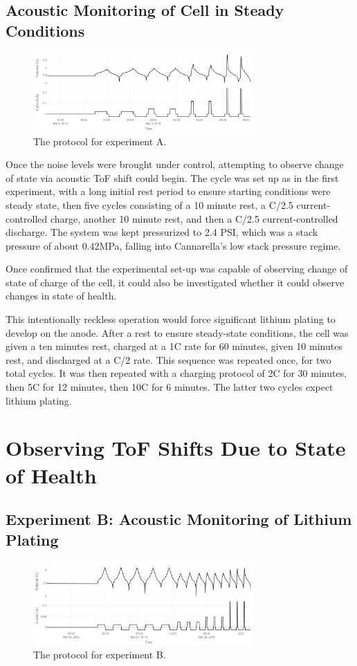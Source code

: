 \subsection{Acoustic Monitoring of Cell in Steady Conditions}
\begin{figure}[t]\label{fig:neware0309}
    \includegraphics[width=0.75\textwidth]{Thesis/neware0309.PNG}
    \centering
    \caption{The protocol for experiment A.}
\end{figure}
Once the noise levels were brought under control, attempting to observe change of state via acoustic ToF shift could begin. The cycle was set up as in the first experiment, with a long initial rest period to ensure starting conditions were steady state, then five cycles consisting of a 10 minute rest, a C/2.5 current-controlled charge, another 10 minute rest, and then a C/2.5 current-controlled discharge. 
The system was kept pressurized to 2.4 PSI, which was a stack pressure of about 0.42MPa, falling into Cannarella's low stack pressure regime.

Once confirmed that the experimental set-up was capable of observing change of state of charge of the cell, it could also be investigated whether it could observe changes in state of health.

This intentionally reckless operation would force significant lithium plating to develop on the anode. 
After a rest to ensure steady-state conditions, the cell was given a ten minutes rest, charged at a 1C rate for 60 minutes, given 10 minutes rest, and discharged at a C/2 rate. 
This sequence was repeated once, for two total cycles. 
It was then repeated with a charging protocol of 2C for 30 minutes, then 5C for 12 minutes, then 10C for 6 minutes. 
The latter two cycles expect lithium plating.

\section{Observing ToF Shifts Due to State of Health} 
\subsection{Experiment B: Acoustic Monitoring of Lithium Plating}
\begin{figure}[t]\label{fig:neware0325}
    \includegraphics[width=0.75\textwidth]{Thesis/neware0325.PNG}
    \centering
    \caption{The protocol for experiment B.}
\end{figure}

